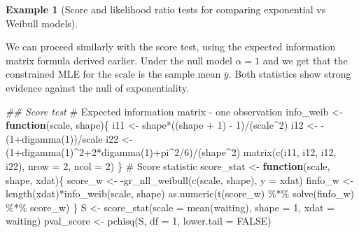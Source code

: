 \documentclass[
  11pt,
  letterpaper,
]{scrbook}
\newenvironment{Shaded}{\begin{snugshade}}{\end{snugshade}}
\newcommand{\AttributeTok}[1]{\textcolor[rgb]{0.40,0.45,0.13}{#1}}
\newcommand{\CommentTok}[1]{\textcolor[rgb]{0.37,0.37,0.37}{#1}}
\newcommand{\ConstantTok}[1]{\textcolor[rgb]{0.56,0.35,0.01}{#1}}
\newcommand{\ControlFlowTok}[1]{\textcolor[rgb]{0.00,0.23,0.31}{\textbf{#1}}}
\newcommand{\DecValTok}[1]{\textcolor[rgb]{0.68,0.00,0.00}{#1}}
\newcommand{\DocumentationTok}[1]{\textcolor[rgb]{0.37,0.37,0.37}{\textit{#1}}}
\newcommand{\FunctionTok}[1]{\textcolor[rgb]{0.28,0.35,0.67}{#1}}
\newcommand{\NormalTok}[1]{\textcolor[rgb]{0.00,0.23,0.31}{#1}}
\newcommand{\OtherTok}[1]{\textcolor[rgb]{0.00,0.23,0.31}{#1}}
\newcommand{\SpecialCharTok}[1]{\textcolor[rgb]{0.37,0.37,0.37}{#1}}
\theoremstyle{plain}
\theoremstyle{plain}
\theoremstyle{definition}
\newtheorem{example}{Example}[chapter]
\theoremstyle{definition}
\theoremstyle{remark}
\begin{document}
\begin{example}[Score and likelihood ratio tests for comparing
exponential vs Weibull
models]\protect\hypertarget{exm-weibull-scoretest}{}\label{exm-weibull-scoretest}

We can proceed similarly with the score test, using the expected
information matrix formula derived earlier. Under the null model
\(\alpha=1\) and we get that the constrained MLE for the scale is the
sample mean \(\overline{y}\). Both statistics show strong evidence
against the null of exponentiality.

\begin{Shaded}
\begin{Highlighting}[]
\DocumentationTok{\#\# Score test}
\CommentTok{\# Expected information matrix {-} one observation}
\NormalTok{info\_weib }\OtherTok{\textless{}{-}} \ControlFlowTok{function}\NormalTok{(scale, shape)\{ }
\NormalTok{  i11 }\OtherTok{\textless{}{-}}\NormalTok{ shape}\SpecialCharTok{*}\NormalTok{((shape }\SpecialCharTok{+} \DecValTok{1}\NormalTok{) }\SpecialCharTok{{-}} \DecValTok{1}\NormalTok{)}\SpecialCharTok{/}\NormalTok{(scale}\SpecialCharTok{\^{}}\DecValTok{2}\NormalTok{)}
\NormalTok{  i12 }\OtherTok{\textless{}{-}} \SpecialCharTok{{-}}\NormalTok{(}\DecValTok{1}\SpecialCharTok{+}\FunctionTok{digamma}\NormalTok{(}\DecValTok{1}\NormalTok{))}\SpecialCharTok{/}\NormalTok{scale}
\NormalTok{  i22 }\OtherTok{\textless{}{-}}\NormalTok{ (}\DecValTok{1}\SpecialCharTok{+}\FunctionTok{digamma}\NormalTok{(}\DecValTok{1}\NormalTok{)}\SpecialCharTok{\^{}}\DecValTok{2}\SpecialCharTok{+}\DecValTok{2}\SpecialCharTok{*}\FunctionTok{digamma}\NormalTok{(}\DecValTok{1}\NormalTok{)}\SpecialCharTok{+}\NormalTok{pi}\SpecialCharTok{\^{}}\DecValTok{2}\SpecialCharTok{/}\DecValTok{6}\NormalTok{)}\SpecialCharTok{/}\NormalTok{(shape}\SpecialCharTok{\^{}}\DecValTok{2}\NormalTok{)}
  \FunctionTok{matrix}\NormalTok{(}\FunctionTok{c}\NormalTok{(i11, i12, i12, i22), }\AttributeTok{nrow =} \DecValTok{2}\NormalTok{, }\AttributeTok{ncol =} \DecValTok{2}\NormalTok{)}
\NormalTok{\}}
\CommentTok{\# Score statistic}
\NormalTok{score\_stat }\OtherTok{\textless{}{-}} \ControlFlowTok{function}\NormalTok{(scale, shape, xdat)\{}
\NormalTok{  score\_w }\OtherTok{\textless{}{-}} \SpecialCharTok{{-}}\FunctionTok{gr\_nll\_weibull}\NormalTok{(}\FunctionTok{c}\NormalTok{(scale, shape), }\AttributeTok{y =}\NormalTok{ xdat)}
\NormalTok{  finfo\_w }\OtherTok{\textless{}{-}} \FunctionTok{length}\NormalTok{(xdat)}\SpecialCharTok{*}\FunctionTok{info\_weib}\NormalTok{(scale, shape)}
  \FunctionTok{as.numeric}\NormalTok{(}\FunctionTok{t}\NormalTok{(score\_w) }\SpecialCharTok{\%*\%} \FunctionTok{solve}\NormalTok{(finfo\_w) }\SpecialCharTok{\%*\%}\NormalTok{ score\_w)}
\NormalTok{\}}
\NormalTok{S }\OtherTok{\textless{}{-}} \FunctionTok{score\_stat}\NormalTok{(}\AttributeTok{scale =} \FunctionTok{mean}\NormalTok{(waiting), }\AttributeTok{shape =} \DecValTok{1}\NormalTok{, }\AttributeTok{xdat =}\NormalTok{ waiting)}
\NormalTok{pval\_score }\OtherTok{\textless{}{-}} \FunctionTok{pchisq}\NormalTok{(S, }\AttributeTok{df =} \DecValTok{1}\NormalTok{, }\AttributeTok{lower.tail =} \ConstantTok{FALSE}\NormalTok{)}


\end{Highlighting}
\end{Shaded}
\end{example}
\end{document}
